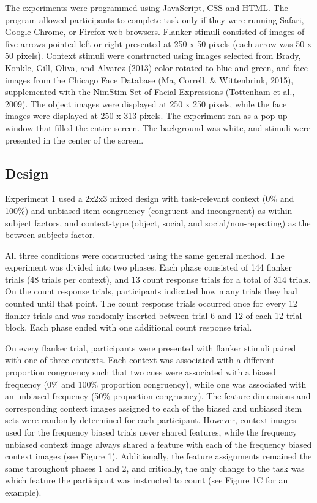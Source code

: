 \documentclass[english,,man,floatsintext]{apa6}
\begin{document}
The experiments were programmed using JavaScript, CSS and HTML. The program allowed participants to complete task only if they were running Safari, Google Chrome, or Firefox web browsers. Flanker stimuli consisted of images of five arrows pointed left or right presented at 250 x 50 pixels (each arrow was 50 x 50 pixels). Context stimuli were constructed using images selected from Brady, Konkle, Gill, Oliva, and Alvarez (2013) color-rotated to blue and green, and face images from the Chicago Face Database (Ma, Correll, \& Wittenbrink, 2015), supplemented with the NimStim Set of Facial Expressions (Tottenham et al., 2009). The object images were displayed at 250 x 250 pixels, while the face images were displayed at 250 x 313 pixels. The experiment ran as a pop-up window that filled the entire screen. The background was white, and stimuli were presented in the center of the screen.

\hypertarget{design}{%
\subsection{Design}\label{design}}

Experiment 1 used a 2x2x3 mixed design with task-relevant context (0\% and 100\%) and unbiased-item congruency (congruent and incongruent) as within-subject factors, and context-type (object, social, and social/non-repeating) as the between-subjects factor.

All three conditions were constructed using the same general method. The experiment was divided into two phases. Each phase consisted of 144 flanker trials (48 trials per context), and 13 count response trials for a total of 314 trials. On the count response trials, participants indicated how many trials they had counted until that point. The count response trials occurred once for every 12 flanker trials and was randomly inserted between trial 6 and 12 of each 12-trial block. Each phase ended with one additional count response trial.

On every flanker trial, participants were presented with flanker stimuli paired with one of three contexts. Each context was associated with a different proportion congruency such that two cues were associated with a biased frequency (0\% and 100\% proportion congruency), while one was associated with an unbiased frequency (50\% proportion congruency). The feature dimensions and corresponding context images assigned to each of the biased and unbiased item sets were randomly determined for each participant. However, context images used for the frequency biased trials never shared features, while the frequency unbiased context image always shared a feature with each of the frequency biased context images (see Figure 1). Additionally, the feature assignments remained the same throughout phases 1 and 2, and critically, the only change to the task was which feature the participant was instructed to count (see Figure 1C for an example).
\end{document}

